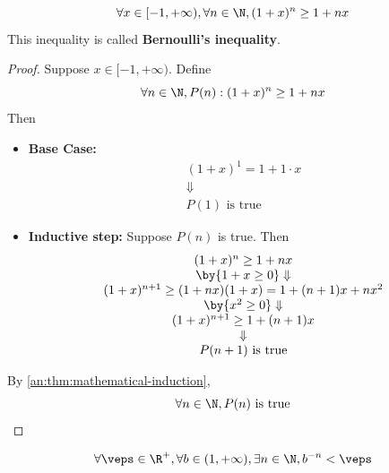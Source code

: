 \bigskip

\begin{lemma} \label{an:lem:bernoullis-inequality}
  \[
    \forall x \in [-1, + \infty), \forall n \in \N, (1 + x)^{n} \geq 1 + nx
  \]
  This inequality is called \textbf{Bernoulli's inequality}.
\end{lemma}

\begin{proof}
  Suppose $x \in [-1, + \infty)$. Define
  \[
    \forall n \in \N, P(n): (1 + x)^{n} \geq 1 + nx
  \]
  Then
  \begin{itemize}
    \item \textbf{Base Case:}
          \[
            \begin{array}{c}
              (1 + x)^{1} = 1 + 1 \cdot x \\
              \Downarrow                  \\
              P(1) \text{ is true}
            \end{array}
          \]
    \item \textbf{Inductive step:} Suppose $P(n)$ is true. Then
          \[
            \begin{array}{c}
              (1 + x)^{n} \geq 1 + nx                                      \\
              \by{\ensuremath{1 + x \geq 0}} \Downarrow                    \\
              (1 + x)^{n + 1} \geq (1 + nx)(1 + x) = 1 + (n + 1)x + nx^{2} \\
              \by{\ensuremath{x^{2} \geq 0}} \Downarrow                    \\
              (1 + x)^{n + 1} \geq 1 + (n + 1)x                            \\
              \Downarrow                                                   \\
              P(n + 1) \text{ is true}
            \end{array}
          \]
  \end{itemize}
  By \cref{an:thm:mathematical-induction},
  \[
    \forall n \in \N, P(n) \text{ is true}
  \]
\end{proof}

\bigskip

\begin{theorem} \label{an:thm:archimedean-property-corollary}
  \[
    \forall \veps \in \R^{+}, \forall b \in (1, + \infty), \exists n \in \N, b^{-n} < \veps
  \]
\end{theorem}

